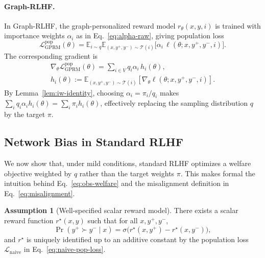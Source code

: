 \documentclass{article}
\theoremstyle{plain}
\theoremstyle{definition}
\newtheorem{assumption}[theorem]{Assumption}
\theoremstyle{remark}
\begin{document}
\paragraph{Graph-RLHF.}
In Graph-RLHF, the graph-personalized reward model $r_\theta(x,y,i)$ is
trained with importance weights $\alpha_i$ as in
Eq.~\eqref{eq:alpha-raw}, giving population loss
\begin{equation}
    \mathcal{L}_{\text{GPRM}}^{\text{pop}}(\theta)
    =
    \mathbb{E}_{i \sim q}
    \mathbb{E}_{(x,y^+,y^-) \sim \mathcal{T}(i)}
    \Big[
        \alpha_i \, \ell(\theta; x,y^+,y^-,i)
    \Big].
    \label{eq:gprm-pop-loss}
\end{equation}
The corresponding gradient is
\begin{equation}
\begin{aligned}
    \nabla_\theta \mathcal{L}_{\text{GPRM}}^{\text{pop}}(\theta)
    =
    \sum_{i \in V} q_i \alpha_i \, h_i(\theta),
    \qquad\quad \\
    h_i(\theta)
    :=
    \mathbb{E}_{(x,y^+,y^-) \sim \mathcal{T}(i)}
    [
        \nabla_\theta \ell(\theta; x,y^+,y^-,i)
    ].
    \label{eq:gprm-pop-grad}
\end{aligned}
\end{equation}
By Lemma~\ref{lem:iw-identity}, choosing $\alpha_i = \pi_i / q_i$ makes
$\sum_i q_i \alpha_i h_i(\theta) = \sum_i \pi_i h_i(\theta)$, effectively
replacing the sampling distribution $q$ by the target $\pi$.

\subsection{Network Bias in Standard RLHF}

We now show that, under mild conditions, standard RLHF optimizes a welfare
objective weighted by $q$ rather than the target weights $\pi$. This makes
formal the intuition behind Eq.~\eqref{eq:obs-welfare} and the misalignment
definition in Eq.~\eqref{eq:misalignment}.

\begin{assumption}[Well-specified scalar reward model]
\label{ass:well-specified}
There exists a scalar reward function $r^\star(x,y)$ such that for all
$x, y^+, y^-$,
\begin{equation}
    \Pr(y^+ \succ y^- \mid x)
    =
    \sigma\big(
        r^\star(x,y^+) - r^\star(x,y^-)
    \big),
    \label{eq:well-specified}
\end{equation}
and $r^\star$ is uniquely identified up to an additive constant by the
population loss $\mathcal{L}_{\text{naive}}$ in
Eq.~\eqref{eq:naive-pop-loss}.
\end{assumption}
\end{document}
